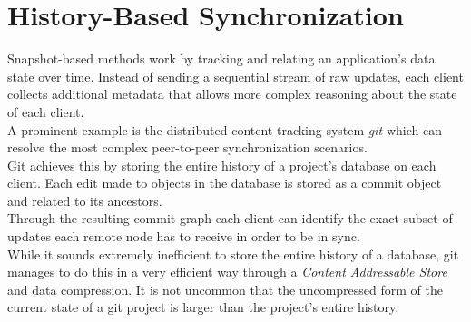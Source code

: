 \section{History-Based Synchronization}
\label{sec:background.history-based}
Snapshot-based methods work by tracking and relating an application's data state over time.
Instead of sending a sequential stream of raw updates, each client collects additional metadata that allows more complex reasoning about the state of each client.\\
A prominent example is the distributed content tracking system \emph{git} \cite{swicegood2008pragmatic} which can resolve the most complex peer-to-peer synchronization scenarios.\\
Git achieves this by storing the entire history of a project's database on each client.
Each edit made to objects in the database is stored as a commit object and related to its ancestors.\\
Through the resulting commit graph each client can identify the exact subset of updates each remote node has to receive in order to be in sync.\\
While it sounds extremely inefficient to store the entire history of a database, git manages to do this in a very efficient way through a \emph{Content Addressable Store} and data compression.
It is not uncommon that the uncompressed form of the current state of a git project is larger than the project's entire history.

